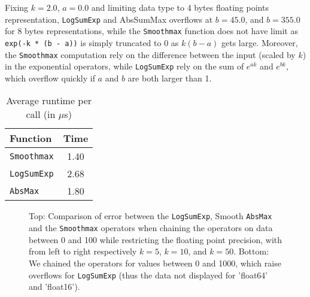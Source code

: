 Fixing $k = 2.0$, $a = 0.0$ and limiting data type to 4 bytes floating points representation, \texttt{LogSumExp} and AbsSumMax overflows at $b = 45.0$, and $b = 355.0$ for 8 bytes representations, while the \texttt{Smoothmax} function does not have limit as \texttt{exp(-k * (b - a))} is simply truncated to 0 as $k (b - a)$ gets large. Moreover, the \texttt{Smoothmax} computation rely on the difference between the input (scaled by $k$) in the exponential operators, while \texttt{LogSumExp} rely on the sum of $e^{ak}$ and $e^{bk}$, which overflow quickly if $a$ and $b$ are both larger than 1.

\begin{table}[H]
    \centering
    \begin{tabular}{l|c}
        \toprule
        Function & Time \\
        \midrule
        \texttt{Smoothmax} & 1.40 \\
        \texttt{LogSumExp} & 2.68 \\
        \texttt{AbsMax}    & 1.80 \\
        \bottomrule
    \end{tabular}
    \caption[Runtime comparison between smooth maximum functions]{Average runtime per call (in $\mu$s)}
    \label{tab:smoothmax-time}
\end{table}

\begin{figure}
    \caption[Approximation error with different floating-point precisions]{Top: Comparison of error between the \texttt{LogSumExp}, Smooth \texttt{AbsMax} and the \texttt{Smoothmax} operators when chaining the operators on data between 0 and 100 while restricting the floating point precision, with from left to right respectively $k=5$, $k=10$, and $k=50$. Bottom: We chained the operators for values between 0 and 1000, which raise overflows for \texttt{LogSumExp} (thus the data not displayed for 'float64' and 'float16'). }
    \label{fig:smoothmax-precision-per-floating-point}
\end{figure}
\midConclusion


